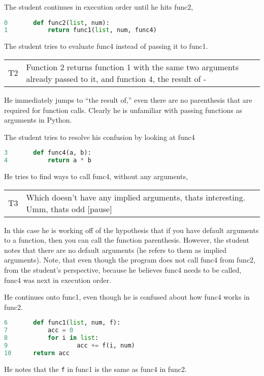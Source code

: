 The student continues in execution order until he hits func2,

\begin{lstlisting}[language=python]
0		def func2(list, num):
1			return func1(list, num, func4)
\end{lstlisting}

The student tries to evaluate func4 instead of passing it to func1.

\begin{tabular}{lp{13cm}}
T2&Function 2 returns function 1 with the same two arguments already passed to it, and function 4, the result of -\\
\end{tabular}

He immediately jumps to ``the result of,'' even there are no parenthesis that are required for function calls.
Clearly he is unfamiliar with passing functions as arguments in Python.

The student tries to resolve his confusion by looking at func4

\begin{lstlisting}[language=python]
3		def func4(a, b):
4			return a * b
\end{lstlisting}

He tries to find ways to call func4, without any arguments,

\begin{tabular}{lp{13cm}}
T3&Which doesn't have any implied arguments, thats interesting. Umm, thats odd [pause]\\
\end{tabular}

In this case he is working off of the hypothesis that if you have default arguments to a function,
  then you can call the function parenthesis.
However, the student notes that there are no default arguments (he refers to them as implied arguments).
Note, that even though the program does not call func4 from func2, from the student's perspective, because he believes func4 needs to be called, func4 was next in execution order.

He continues onto func1, even though he is confused about how func4 works in func2.

\begin{lstlisting}[language=python]
6		def func1(list, num, f):
7			acc = 0
8			for i in list:
9					acc += f(i, num)
10		return acc
\end{lstlisting}

He notes that the \texttt{f} in func1 is the same as func4 in func2. \\


